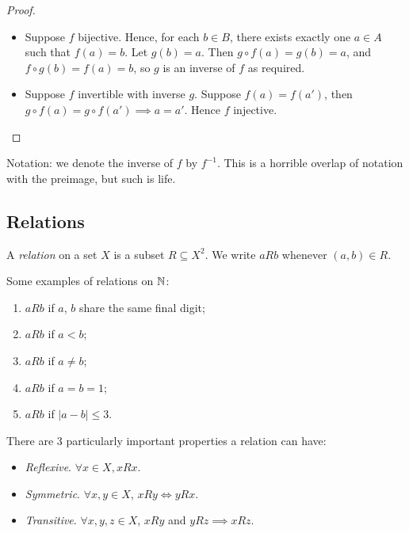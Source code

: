 \documentclass{../template/note}
\begin{document}
    \begin{proof}
        \begin{itemize}
            \item[\(\impliedby\)] Suppose \(f\) bijective. Hence, for each \(b \in B\), there exists exactly one \(a \in A\) such that \(f(a) = b\). Let \(g(b) = a\). Then \(g \circ f(a) = g(b) = a\), and \(f \circ g(b) = f(a) = b\), so \(g\) is an inverse of \(f\) as required.
            \item[\(\implies\)] Suppose \(f\) invertible with inverse \(g\). Suppose \(f(a) = f(a')\), then \(g \circ f(a) = g \circ f(a') \implies a = a'\). Hence \(f\) injective.    
        \end{itemize}
    \end{proof}
    
    Notation: we denote the inverse of \(f\) by \(f^{-1}\). This is a horrible overlap of notation with the preimage, but such is life.

    \subsection{Relations}
    
    \begin{definition}
        A \emph{relation} on a set \(X\) is a subset \(R \subseteq X^2\). We write \(aRb\) whenever \((a, b) \in R\).
    \end{definition}
    
    \begin{example}
        Some examples of relations on \(\mathbb N\):
        \begin{enumerate}[label=\protect\circled{\arabic*}]
            \item \(aRb\) if \(a\), \(b\) share the same final digit;
            \item \(aRb\) if \(a < b\);
            \item \(aRb\) if \(a \neq b\);
            \item \(aRb\) if \(a = b = 1\);
            \item \(aRb\) if \(|a-b| \leq 3\).
        \end{enumerate}
    \end{example}
    
    \begin{definition}
        There are 3 particularly important properties a relation can have:
        \begin{itemize}
            \item \emph{Reflexive}. \(\forall x \in X, xRx\).
            \item \emph{Symmetric}. \(\forall x, y \in X\), \(xRy \iff yRx\).
            \item \emph{Transitive}. \(\forall x, y, z \in X\), \(xRy\) and \(yRz \implies xRz\).
        \end{itemize}
    \end{definition}
\end{document}
